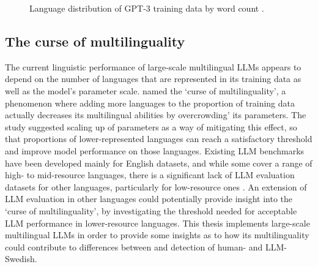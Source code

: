 \documentclass[thesis]{cluu}
\begin{document}
\begin{figure}[t!]
{%
  }
  \caption[Language distribution of the GPT-3 training data]{%
    Language distribution of GPT-3 training data by word
    count \parencite{brown2020language}.}
  \label{fig:gpt3-langdist}
\end{figure}

\subsection{The curse of multilinguality}
The current linguistic performance of large-scale multilingual LLMs appears to depend on the number of languages that are represented in its training data as well as the model's parameter scale. \textcite{conneau2020unsupervised} named the `curse of multilinguality', a phenomenon where adding more languages to the proportion of training data actually decreases its multilingual abilities by overcrowding' its parameters. The study suggested scaling up of parameters as a way of mitigating this effect, so that proportions of lower-represented languages can reach a satisfactory threshold and improve model performance on those languages. Existing LLM benchmarks have been developed mainly for English datasets, and while some cover a range of high- to mid-resource languages, there is a significant lack of LLM evaluation datasets for other languages, particularly for low-resource ones \parencite{wu2025survey}. An extension of LLM evaluation in other languages could potentially provide insight into the `curse of multilinguality', by investigating the threshold needed for acceptable LLM performance in lower-resource languages. This thesis implements large-scale multilingual LLMs in order to provide some insights as to how its multilinguality could contribute to differences between and detection of human- and LLM-Swedish.
\end{document}
